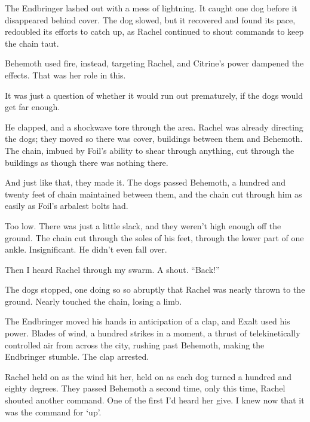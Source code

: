 The Endbringer lashed out with a mess of lightning.  It caught one dog before it disappeared behind cover.  The dog slowed, but it recovered and found its pace, redoubled its efforts to catch up, as Rachel continued to shout commands to keep the chain taut.



Behemoth used fire, instead, targeting Rachel, and Citrine's power dampened the effects.  That was her role in this.



It was just a question of whether it would run out prematurely, if the dogs would get far enough.



He clapped, and a shockwave tore through the area.  Rachel was already directing the dogs; they moved so there was cover, buildings between them and Behemoth.  The chain, imbued by Foil's ability to shear through anything, cut through the buildings as though there was nothing there.



And just like that, they made it.  The dogs passed Behemoth, a hundred and twenty feet of chain maintained between them, and the chain cut through him as easily as Foil's arbalest bolts had.



Too low.  There was just a little slack, and they weren't high enough off the ground.  The chain cut through the soles of his feet, through the lower part of one ankle.  Insignificant.  He didn't even fall over.



Then I heard Rachel through my swarm.  A shout.  ``Back!''



The dogs stopped, one doing so so abruptly that Rachel was nearly thrown to the ground.  Nearly touched the chain, losing a limb.



The Endbringer moved his hands in anticipation of a clap, and Exalt used his power.  Blades of wind, a hundred strikes in a moment, a thrust of telekinetically controlled air from across the city, rushing past Behemoth, making the Endbringer stumble.  The clap arrested.



Rachel held on as the wind hit her, held on as each dog turned a hundred and eighty degrees.  They passed Behemoth a second time, only this time, Rachel shouted another command.  One of the first I'd heard her give.  I knew now that it was the command for `up'.




